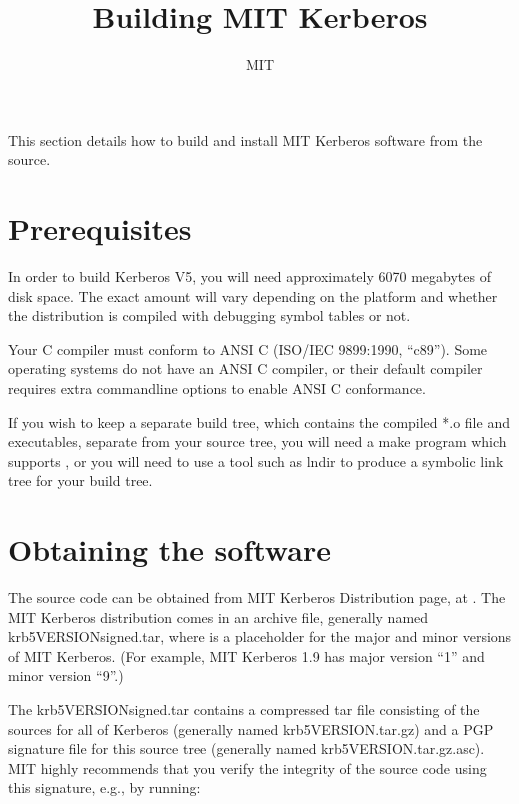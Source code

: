 \documentclass[letterpaper,10pt,english]{sphinxmanual}
\title{Building MIT Kerberos}
\date{ }
\author{MIT}
\begin{document}
\pagestyle{empty}
\sphinxmaketitle
\pagestyle{plain}
\sphinxtableofcontents
\pagestyle{normal}
\label{\detokenize{build/index::doc}}


\sphinxAtStartPar
This section details how to build and install MIT Kerberos software
from the source.


\chapter{Prerequisites}
\label{\detokenize{build/index:prerequisites}}
\sphinxAtStartPar
In order to build Kerberos V5, you will need approximately 60\sphinxhyphen{}70
megabytes of disk space.  The exact amount will vary depending on the
platform and whether the distribution is compiled with debugging
symbol tables or not.

\sphinxAtStartPar
Your C compiler must conform to ANSI C (ISO/IEC 9899:1990, “c89”).
Some operating systems do not have an ANSI C compiler, or their
default compiler requires extra command\sphinxhyphen{}line options to enable ANSI C
conformance.

\sphinxAtStartPar
If you wish to keep a separate build tree, which contains the compiled
*.o file and executables, separate from your source tree, you will
need a make program which supports , or you will need to use
a tool such as lndir to produce a symbolic link tree for your build
tree.


\chapter{Obtaining the software}
\label{\detokenize{build/index:obtaining-the-software}}
\sphinxAtStartPar
The source code can be obtained from MIT Kerberos Distribution page,
at .
The MIT Kerberos distribution comes in an archive file, generally
named krb5\sphinxhyphen{}VERSION\sphinxhyphen{}signed.tar, where  is a placeholder for
the major and minor versions of MIT Kerberos.  (For example, MIT
Kerberos 1.9 has major version “1” and minor version “9”.)

\sphinxAtStartPar
The krb5\sphinxhyphen{}VERSION\sphinxhyphen{}signed.tar contains a compressed tar file consisting
of the sources for all of Kerberos (generally named
krb5\sphinxhyphen{}VERSION.tar.gz) and a PGP signature file for this source tree
(generally named krb5\sphinxhyphen{}VERSION.tar.gz.asc).  MIT highly recommends that
you verify the integrity of the source code using this signature,
e.g., by running:
\end{document}

